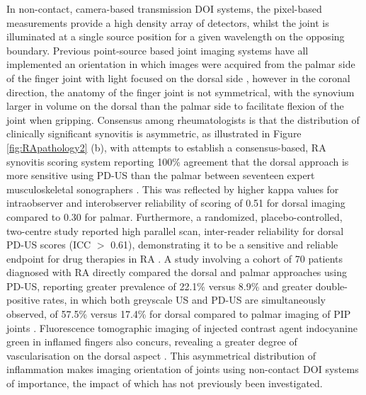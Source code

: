 \documentclass[twoside]{bhamthesis}
\theoremstyle{definition}
\begin{document}
In non-contact, camera-based transmission DOI systems, the pixel-based measurements provide a high density array of detectors, whilst the joint is illuminated at a single source position for a given wavelength on the opposing boundary. Previous point-source based joint imaging systems have all implemented an orientation in which images were acquired from the palmar side of the finger joint with light focused on the dorsal side \cite{hielscher2004sagittal,beuthan2002light,prapavat1995evaluation,prapavat1998evaluation,scheel2003laser}, however in the coronal direction, the anatomy of the finger joint is not symmetrical, with the synovium larger in volume on the dorsal than the palmar side to facilitate flexion of the joint when gripping. Consensus among rheumatologists is that the distribution of clinically significant synovitis is asymmetric, as illustrated in Figure \ref{fig:RApathology2} (b), with attempts to establish a consensus-based, RA synovitis scoring system reporting 100\% agreement that the dorsal approach is more sensitive using PD-US than the palmar between seventeen expert musculoskeletal sonographers \cite{d2017scoring}. This was reflected by higher kappa values for intraobserver and interobserver reliability of scoring of 0.51 for dorsal imaging compared to 0.30 for palmar. Furthermore, a randomized, placebo-controlled, two-centre study reported high parallel scan, inter-reader reliability for dorsal PD-US scores (ICC $>$ 0.61), demonstrating it to be a sensitive and reliable endpoint for drug therapies in RA \cite{seymour2012ultrasound}. A study involving a cohort of 70 patients diagnosed with RA directly compared the dorsal and palmar approaches using PD-US, reporting greater prevalence of 22.1\% versus 8.9\% and greater double-positive rates, in which both greyscale US and PD-US are simultaneously observed, of 57.5\% versus 17.4\% for dorsal compared to palmar imaging of PIP joints \cite{witt2014ultrasound}. Fluorescence tomographic imaging of injected contrast agent indocyanine green in inflamed fingers also concurs, revealing a greater degree of vascularisation on the dorsal aspect \cite{mohajerani2014fluorescence}. This asymmetrical distribution of inflammation makes imaging orientation of joints using non-contact DOI systems of importance, the impact of which has not previously been investigated.
\end{document}
